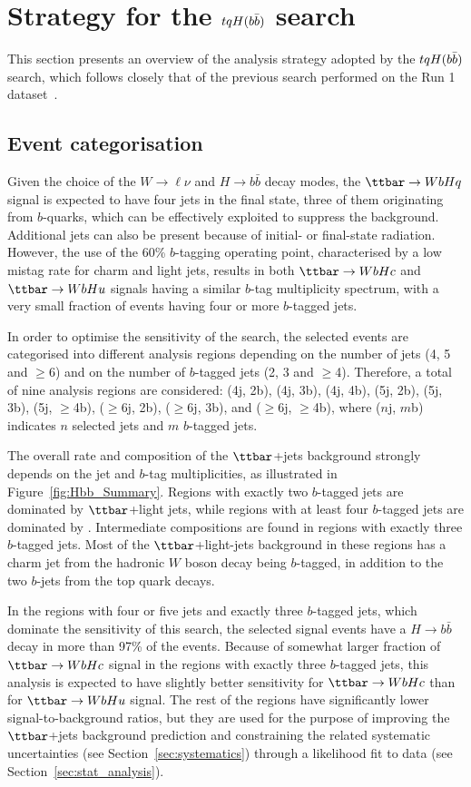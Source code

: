 
\section{Strategy for the $tqH(b\bar{b})$ search}
\label{sec:strategy_Hbb}

This section presents an overview of the analysis strategy adopted by the $tqH(b\bar{b})$ search, which
follows closely that of the previous search performed on the Run 1 dataset~\cite{Aad:2015pja}.

\subsection{Event categorisation}
\label{sec:event_categorisation}

Given the choice of the $W\to\ell\nu$ and $H\to b\bar{b}$ decay modes, the $\ttbar \to WbHq$ signal 
is expected to have four jets in the final state, three of them originating from $b$-quarks, which 
can be effectively exploited to suppress the background. 
Additional jets can also be present because of initial- or final-state radiation.
However, the use of the 60\% $b$-tagging operating point, characterised by a low mistag rate for
charm and light jets, results in both $\Hc$ and $\Hu$ signals having a similar $b$-tag multiplicity spectrum,
with a very small fraction of events having four or more $b$-tagged jets.

In order to optimise the sensitivity of the search, the selected events are categorised into different analysis 
regions depending on the number of jets (4, 5 and $\geq$6) and on the number of $b$-tagged jets (2, 3 and $\geq$4).
Therefore, a total of nine analysis regions are considered:
(4j, 2b), (4j, 3b), (4j, 4b), (5j, 2b), (5j, 3b), (5j, $\geq$4b), ($\geq$6j, 2b), ($\geq$6j, 3b), and ($\geq$6j, $\geq$4b), 
where ($n$j, $m$b) indicates $n$ selected jets and $m$ $b$-tagged jets. 

The overall rate and composition of the $\ttbar$+jets background strongly depends on the jet and $b$-tag 
multiplicities, as illustrated in Figure~\ref{fig:Hbb_Summary}.
Regions with exactly two $b$-tagged jets are dominated by $\ttbar$+light jets, while regions with 
at least four $b$-tagged jets are dominated by \ttbin. Intermediate compositions are found in regions with exactly three 
$b$-tagged jets.  Most of the $\ttbar$+light-jets background in these regions has a charm jet from the hadronic $W$ boson 
decay  being $b$-tagged, in addition to the two $b$-jets from the top quark decays.

In the regions with four or five jets and exactly three $b$-tagged jets, which dominate the sensitivity of this search, 
the selected signal events have a $H \to b\bar{b}$ decay in more than 97\% of the events.
Because of somewhat larger fraction of $\Hc$ signal in the regions with exactly three $b$-tagged jets,
this analysis is expected to have slightly better sensitivity for $\Hc$ than for $\Hu$ signal.
The rest of the regions have significantly lower signal-to-background ratios, but they are used for the purpose of improving 
the $\ttbar$+jets background prediction and constraining the related systematic uncertainties (see Section~\ref{sec:systematics})
through a likelihood fit to data (see Section~\ref{sec:stat_analysis}).  

